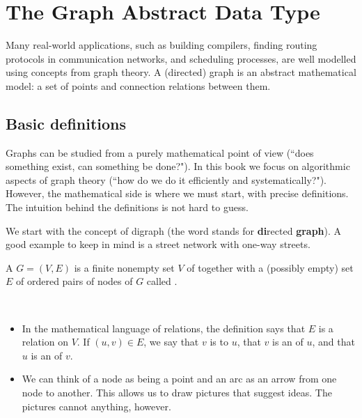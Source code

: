\chapter{The Graph Abstract Data Type}
\label{ch:graphadt}

Many real-world applications, such as building compilers, finding routing
protocols in communication networks, and scheduling processes, are well
modelled using concepts from graph theory. A (directed) graph is an
abstract mathematical model:  a set of points and connection relations
between them.

\section{Basic definitions}
\label{sec:graphdefs}

Graphs can be studied from a purely mathematical point of view (``does
something exist, can something be done?"). In this book we focus on
algorithmic aspects of graph theory (``how do we do it efficiently and
systematically?").  However, the mathematical side is where we must
start, with precise definitions. The intuition behind the definitions is
not hard to guess.

We start with the concept of digraph (the word stands for
\textbf{di}rected \textbf{graph}). A good example to keep in mind 
is a street network with one-way streets. 

\begin{Definition}\label{def:digraph} 

A  $G=(V,E)$ is a  finite nonempty set $V$ of 
together with a (possibly empty) set $E$ of ordered pairs of nodes of
$G$ called .

\end{Definition}

\begin{note}   
\

\begin{itemize} 
\item 
In the mathematical language of relations,
the definition says that $E$ is a relation on $V$. If $(u,
v)\in E$, we say that $v$ is  to $u$, that
$v$ is an  of $u$, and that $u$ is an
 of $v$.
\item
We can think of a node as being a point and an arc as an arrow from one 
node to another. This allows us to draw pictures that suggest ideas. The 
pictures cannot  anything, however.
\end{itemize}
\end{note}

